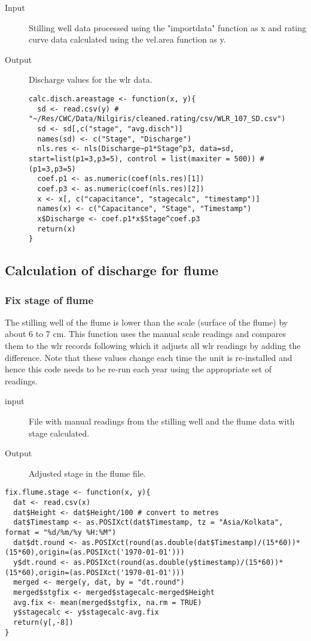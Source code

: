 \documentclass[a4paper]{article}
\begin{document}
\begin{description}
\item[{Input}] Stilling well data processed using the "importdata" function as x and rating curve data calculated using the vel.area function as y.
\item[{Output}] Discharge values for the wlr data. 

\begin{verbatim}
calc.disch.areastage <- function(x, y){
  sd <- read.csv(y) # "~/Res/CWC/Data/Nilgiris/cleaned.rating/csv/WLR_107_SD.csv")
  sd <- sd[,c("stage", "avg.disch")]
  names(sd) <- c("Stage", "Discharge")
  nls.res <- nls(Discharge~p1*Stage^p3, data=sd, start=list(p1=3,p3=5), control = list(maxiter = 500)) # (p1=3,p3=5)
  coef.p1 <- as.numeric(coef(nls.res)[1])
  coef.p3 <- as.numeric(coef(nls.res)[2])
  x <- x[, c("capacitance", "stagecalc", "timestamp")]
  names(x) <- c("Capacitance", "Stage", "Timestamp")
  x$Discharge <- coef.p1*x$Stage^coef.p3
  return(x)
}
\end{verbatim}
\end{description}

\subsection*{Calculation of discharge for flume}
\label{sec:orga23a749}

\subsubsection*{Fix stage of flume}
\label{sec:orgb9b6f82}

The stilling well of the flume is lower than the scale (surface of the flume) by about 6 to 7 cm. This function uses the manual scale readings and compares them to the wlr records following which it adjusts all wlr readings by adding the difference. Note that these values change each time the unit is re-installed and hence this code needs to be re-run each year using the appropriate set of readings.

\begin{description}
\item[{input}] File with manual readings from the stilling well and the flume data with stage calculated.
\item[{Output}] Adjusted stage in the flume file.
\end{description}

\begin{verbatim}
fix.flume.stage <- function(x, y){
  dat <- read.csv(x)
  dat$Height <- dat$Height/100 # convert to metres
  dat$Timestamp <- as.POSIXct(dat$Timestamp, tz = "Asia/Kolkata", format = "%d/%m/%y %H:%M")
  dat$dt.round <- as.POSIXct(round(as.double(dat$Timestamp)/(15*60))*(15*60),origin=(as.POSIXct('1970-01-01')))
  y$dt.round <- as.POSIXct(round(as.double(y$timestamp)/(15*60))*(15*60),origin=(as.POSIXct('1970-01-01')))
  merged <- merge(y, dat, by = "dt.round")
  merged$stgfix <- merged$stagecalc-merged$Height
  avg.fix <- mean(merged$stgfix, na.rm = TRUE)
  y$stagecalc <- y$stagecalc-avg.fix
  return(y[,-8])
}    
\end{verbatim}
\end{document}
